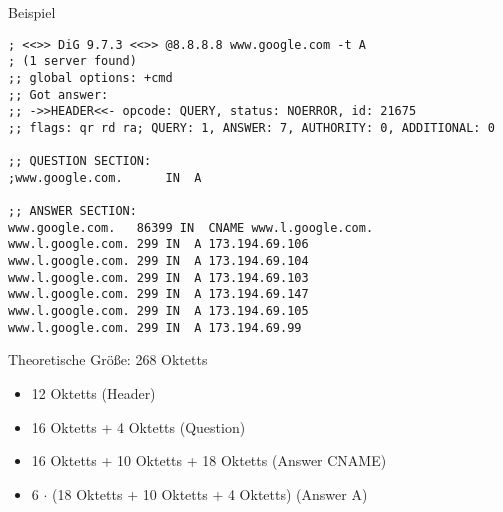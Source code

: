 \documentclass{beamer}
\begin{document}


  \begin{frame}[fragile]{\mytitle}{Beispiel}
      \begin{tiny}
      \begin{verbatim}
; <<>> DiG 9.7.3 <<>> @8.8.8.8 www.google.com -t A
; (1 server found)
;; global options: +cmd
;; Got answer:
;; ->>HEADER<<- opcode: QUERY, status: NOERROR, id: 21675
;; flags: qr rd ra; QUERY: 1, ANSWER: 7, AUTHORITY: 0, ADDITIONAL: 0

;; QUESTION SECTION:
;www.google.com.      IN  A

;; ANSWER SECTION:
www.google.com.   86399 IN  CNAME www.l.google.com.
www.l.google.com. 299 IN  A 173.194.69.106
www.l.google.com. 299 IN  A 173.194.69.104
www.l.google.com. 299 IN  A 173.194.69.103
www.l.google.com. 299 IN  A 173.194.69.147
www.l.google.com. 299 IN  A 173.194.69.105
www.l.google.com. 299 IN  A 173.194.69.99
      \end{verbatim}
  \end{tiny}
Theoretische Größe: 268 Oktetts
\begin{itemize}
  \item 12 Oktetts (Header)
  \item 16 Oktetts + 4 Oktetts (Question)
  \item 16 Oktetts + 10 Oktetts + 18 Oktetts (Answer CNAME)
  \item 6 $\cdot$ (18 Oktetts + 10 Oktetts + 4 Oktetts) (Answer A)
\end{itemize}
\end{frame}
\end{document}
